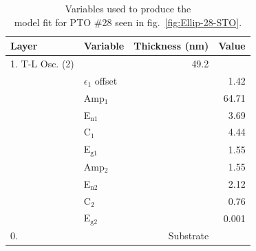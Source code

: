 \begin{table}[htbp]
	\centering
	\caption[PTO \#28 Ellipsometric Model Variables]{Variables used to produce the\\model fit for PTO \#28 seen in fig.~\vref{fig:Ellip-28-STO}. \label{tbl:PTO-28-ellip-variables}}
	\begin{tabular}{l l r r}
	\toprule
	Layer&Variable&Thickness (nm)&Value\\
	\midrule
	1. T-L Osc. (2)&&49.2&\\
	&$\epsilon_{1}$ offset&&1.42\\
	&Amp$_{1}$&&64.71\\
	&E$_{\mathrm{n 1}}$&&3.69\\
	&C$_{1}$&&4.44\\
	&E$_{\mathrm{g1}}$&&1.55\\
	&Amp$_{2}$&&1.55\\
	&E$_{\mathrm{n 2}}$&&2.12\\
	&C$_{2}$&&0.76\\
	&E$_{\mathrm{g2}}$&&0.001\\
	0. \ce{STO}&&Substrate&\\
	\bottomrule
	\end{tabular}
\end{table}

